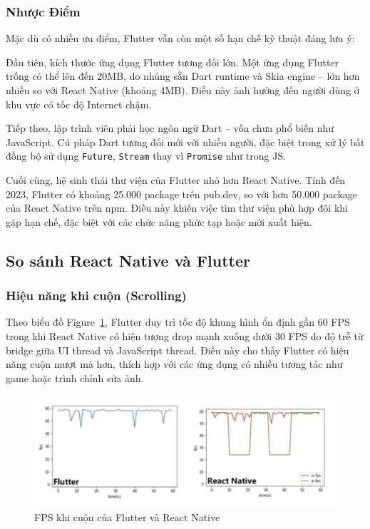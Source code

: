 \subsubsection{Nhược Điểm}

Mặc dù có nhiều ưu điểm, Flutter vẫn còn một số hạn chế kỹ thuật đáng lưu ý:

\vspace{0.5em}

Đầu tiên, kích thước ứng dụng Flutter tương đối lớn.  
Một ứng dụng Flutter trống có thể lên đến 20MB, do nhúng sẵn Dart runtime và Skia engine – lớn hơn nhiều so với React Native (khoảng 4MB).  
Điều này ảnh hưởng đến người dùng ở khu vực có tốc độ Internet chậm.

\vspace{0.5em}

Tiếp theo, lập trình viên phải học ngôn ngữ Dart – vốn chưa phổ biến như JavaScript. Cú pháp Dart tương đối mới với nhiều người, đặc biệt trong xử lý bất đồng bộ sử dụng \texttt{Future}, \texttt{Stream} thay vì \texttt{Promise} như trong JS.

\vspace{0.5em}

Cuối cùng, hệ sinh thái thư viện của Flutter nhỏ hơn React Native. Tính đến 2023, Flutter có khoảng 25.000 package trên pub.dev, so với hơn 50.000 package của React Native trên npm. Điều này khiến việc tìm thư viện phù hợp đôi khi gặp hạn chế, đặc biệt với các chức năng phức tạp hoặc mới xuất hiện.

\subsection{So sánh React Native và Flutter}
\renewcommand{\labelitemi}{--}

\subsubsection{Hiệu năng khi cuộn (Scrolling)}

  Theo biểu đồ Figure~\ref{fig:scrolling}, Flutter duy trì tốc độ khung hình ổn định gần 60 FPS trong khi React Native có hiện tượng drop mạnh xuống dưới 30 FPS do độ trễ từ bridge giữa UI thread và JavaScript thread. Điều này cho thấy Flutter có hiệu năng cuộn mượt mà hơn, thích hợp với các ứng dụng có nhiều tương tác như game hoặc trình chỉnh sửa ảnh.

\begin{figure}[H]
    \centering
    \includegraphics[width=0.8\linewidth]{images/scrolling.png}
    \caption{FPS khi cuộn của Flutter và React Native \cite{quoality2021}}
    \label{fig:scrolling}
\end{figure}

